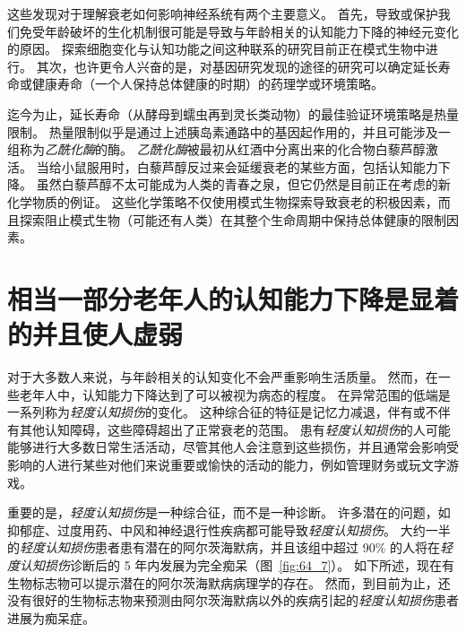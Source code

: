 这些发现对于理解衰老如何影响神经系统有两个主要意义。
首先，导致或保护我们免受年龄破坏的生化机制很可能是导致与年龄相关的认知能力下降的神经元变化的原因。
探索细胞变化与认知功能之间这种联系的研究目前正在模式生物中进行。
其次，也许更令人兴奋的是，对基因研究发现的途径的研究可以确定延长寿命或健康寿命（一个人保持总体健康的时期）的药理学或环境策略。


迄今为止，延长寿命（从酵母到蠕虫再到灵长类动物）的最佳验证环境策略是热量限制。
热量限制似乎是通过上述胰岛素通路中的基因起作用的，并且可能涉及一组称为\textit{乙酰化酶}的酶。
\textit{乙酰化酶}被最初从红酒中分离出来的化合物白藜芦醇激活。
当给小鼠服用时，白藜芦醇反过来会延缓衰老的某些方面，包括认知能力下降。
虽然白藜芦醇不太可能成为人类的青春之泉，但它仍然是目前正在考虑的新化学物质的例证。
这些化学策略不仅使用模式生物探索导致衰老的积极因素，而且探索阻止模式生物（可能还有人类）在其整个生命周期中保持总体健康的限制因素。



\section{相当一部分老年人的认知能力下降是显着的并且使人虚弱}

对于大多数人来说，与年龄相关的认知变化不会严重影响生活质量。
然而，在一些老年人中，认知能力下降达到了可以被视为病态的程度。
在异常范围的低端是一系列称为\textit{轻度认知损伤}的变化。
这种综合征的特征是记忆力减退，伴有或不伴有其他认知障碍，这些障碍超出了正常衰老的范围。
患有\textit{轻度认知损伤}的人可能能够进行大多数日常生活活动，尽管其他人会注意到这些损伤，并且通常会影响受影响的人进行某些对他们来说重要或愉快的活动的能力，例如管理财务或玩文字游戏。


重要的是，\textit{轻度认知损伤}是一种综合征，而不是一种诊断。
许多潜在的问题，如抑郁症、过度用药、中风和神经退行性疾病都可能导致\textit{轻度认知损伤}。
大约一半的\textit{轻度认知损伤}患者患有潜在的阿尔茨海默病，并且该组中超过 90\% 的人将在\textit{轻度认知损伤}诊断后的 5 年内发展为完全痴呆（图~\ref{fig:64_7}）。
如下所述，现在有生物标志物可以提示潜在的阿尔茨海默病病理学的存在。
然而，到目前为止，还没有很好的生物标志物来预测由阿尔茨海默病以外的疾病引起的\textit{轻度认知损伤}患者进展为痴呆症。


